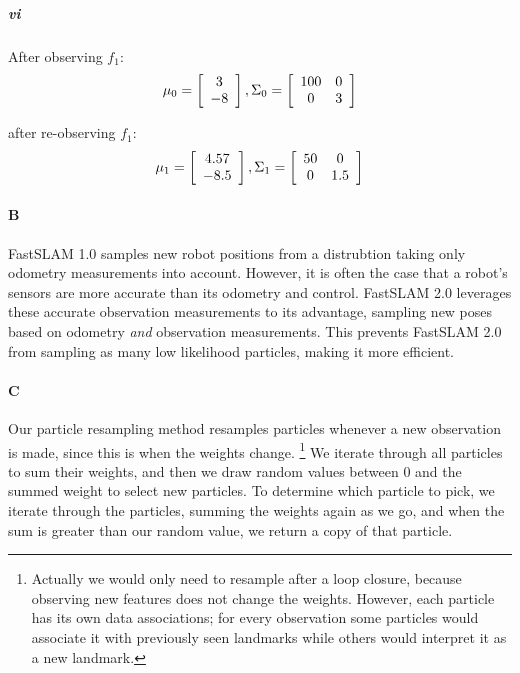 \documentclass[12pt]{article}
\begin{document}
\subparagraph{vi}
After observing $f_1$: \\
$$\mu_0 = \left[ \begin{array}{c}
3 \\
-8
\end{array}\right],
\Sigma_0 = \left[ \begin{array}{c c}
100 & 0 \\
0 & 3
\end{array}\right]$$

after re-observing $f_1$:
$$\mu_1 = \left[ \begin{array}{c}
4.57 \\
-8.5
\end{array}\right],
\Sigma_1 = \left[ \begin{array}{c c c c c c c}
50 & 0 \\
0 & 1.5
\end{array}\right]$$

\paragraph{B}
FastSLAM 1.0 samples new robot positions from a distrubtion taking only
odometry measurements into account. However, it is often the case that
a robot's sensors are more accurate than its odometry and control. FastSLAM 2.0
leverages these accurate observation measurements to its advantage, sampling
new poses based on odometry \emph{and} observation measurements. This prevents
FastSLAM 2.0 from sampling as many low likelihood particles, making it more
efficient.

\paragraph{C}
Our particle resampling method resamples particles whenever a new observation
is made, since this is when the weights change. \footnote{Actually we would only need to resample
after a loop closure, because observing new features does not change the weights. However,
each particle has its own data associations; for every observation some particles would
associate it with previously seen landmarks while others would interpret it as a new landmark.}
We iterate through all particles to sum their weights, and then we draw random values between 0 and
the summed weight to select new particles. To determine which particle to pick,
we iterate through the particles, summing the weights again as we go, and when
the sum is greater than our random value, we return a copy of that particle.
\end{document}

